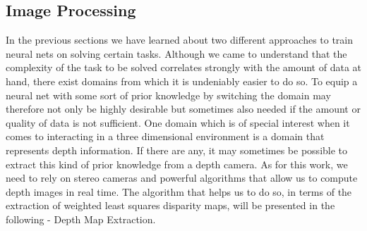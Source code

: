 \subsection{Image Processing}
In the previous sections we have learned about two different approaches to train neural nets on solving certain tasks. Although we came to understand that the complexity of the task to be solved correlates strongly with the amount of data at hand, there exist domains from which it is undeniably easier to do so. To equip a neural net with some sort of prior knowledge by switching the domain may therefore not only be highly desirable but sometimes also needed if the amount or quality of data is not sufficient. One domain which is of special interest when it comes to interacting in a three dimensional environment is a domain that represents depth information. If there are any, it may sometimes be possible to extract this kind of prior knowledge from a depth camera. As for this work, we need to rely on stereo cameras and powerful algorithms that allow us to compute depth images in real time. The algorithm that helps us to do so, in terms of the extraction of weighted least squares disparity maps, will be presented in the following - Depth Map Extraction.
